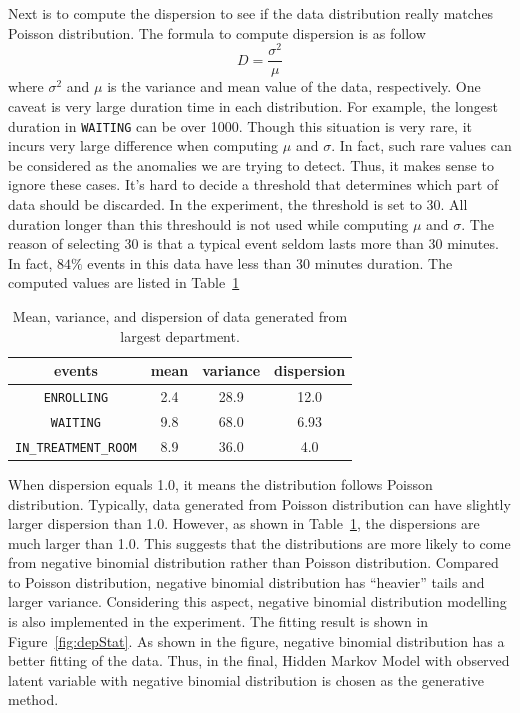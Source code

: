 Next is to compute the dispersion to see if the data distribution really matches Poisson distribution. The formula to compute dispersion is as follow
\begin{equation*}
	D = \frac{\sigma^2}{\mu}
\end{equation*}
where $\sigma^2$ and $\mu$ is the variance and mean value of the data, respectively. One caveat is very large duration time in each distribution. For example, the longest duration in \texttt{WAITING} can be over 1000. Though this situation is very rare, it incurs very large difference when computing $\mu$ and $\sigma$. In fact, such rare values can be considered as the anomalies we are trying to detect. Thus, it makes sense to ignore these cases. It's hard to decide a threshold that determines which part of data should be discarded. In the experiment, the threshold is set to 30. All duration longer than this threshould is not used while computing $\mu$ and $\sigma$. The reason of selecting 30 is that a typical event seldom lasts more than 30 minutes. In fact, $84\%$ events in this data have less than 30 minutes duration. The computed values are listed in Table~\ref{tab:dispersion}
\begin{table}[!ht]
	\caption{Mean, variance, and dispersion of data generated from largest department.}
	\begin{center}
		\begin{tabular}{|c|c|c|c|}
			\hline
			events & mean & variance & dispersion \\ \hline
			\texttt{ENROLLING}	& 2.4 & 28.9 & 12.0 \\ \hline
			\texttt{WAITING} & 9.8 & 68.0 & 6.93 \\ \hline
			\texttt{IN\_TREATMENT\_ROOM} & 8.9 & 36.0 & 4.0 \\ 
			\hline
		\end{tabular}
	\end{center}
	\label{tab:dispersion}
\end{table}
When dispersion equals 1.0, it means the distribution follows Poisson distribution. Typically, data generated from Poisson distribution can have slightly larger dispersion than 1.0. However, as shown in Table~\ref{tab:dispersion}, the dispersions are much larger than 1.0. This suggests that the distributions are more likely to come from negative binomial distribution rather than Poisson distribution. Compared to Poisson distribution, negative binomial distribution has ``heavier'' tails and larger variance. Considering this aspect, negative binomial distribution modelling is also implemented in the experiment. The fitting result is shown in Figure~\ref{fig:depStat}. As shown in the figure, negative binomial distribution has a better fitting of the data. Thus, in the final, Hidden Markov Model with observed latent variable with negative binomial distribution is chosen as the generative method.
